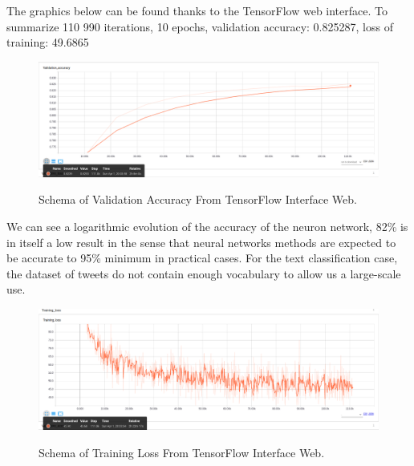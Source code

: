 \documentclass{acmtog} %
\begin{document}
The graphics below can be found thanks to the TensorFlow web interface.
To summarize 110 990 iterations, 10 epochs, validation accuracy: 0.825287, loss of training: 49.6865

\begin{figure}[H]
{\includegraphics[width=\linewidth]{validation-accuracy.png}}
\caption{Schema of Validation Accuracy From TensorFlow Interface Web.}
  \label{fig:archivedb}
\end{figure}

We can see a logarithmic evolution of the accuracy of the neuron network, 82\% is in itself a low result in the sense that neural networks methods are expected to be accurate to 95\% minimum in practical cases. For the text classification case, the dataset of tweets do not contain enough vocabulary to allow us a large-scale use.

\begin{figure}[H]
{\includegraphics[width=\linewidth]{training-loss.png}}
\caption{Schema of Training Loss From TensorFlow Interface Web.}
  \label{fig:archivedb}
\end{figure}
\end{document}
